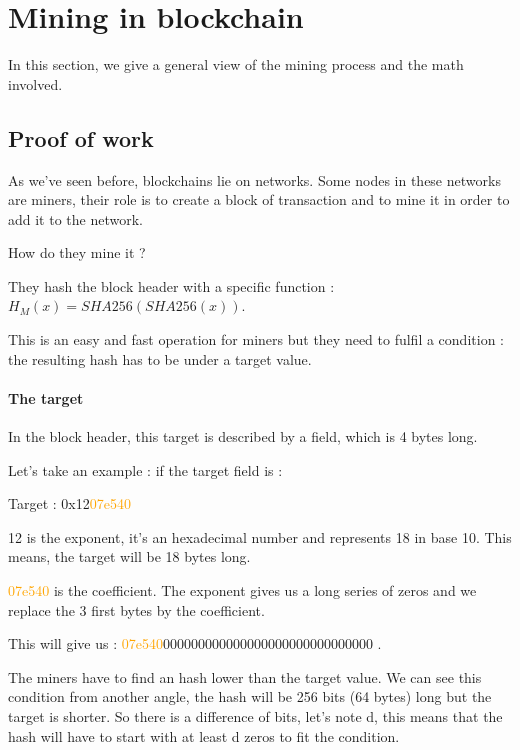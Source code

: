 \section{Mining in blockchain} \label{mining}

In this section, we give a general view of the mining process and the math involved.

  \subsection{Proof of work}

As we've seen before, blockchains lie on networks. Some nodes in these networks are miners, their role is to create a block of transaction and to mine it in order to add it to the network. \newline

How do they mine it ? \newline

They hash the block header with a specific function : $H_M(x) = SHA256(SHA256(x))$.

This is an easy and fast operation for miners but they need to fulfil a condition : the resulting hash has to be under a target value.

  \paragraph{The target} \label{target}

In the block header, this target is described by a field, which is 4 bytes long.

Let's take an example : if the target field is : \newline

Target : 0x12\textcolor{orange}{07e540} \newline

12 is the exponent, it's an hexadecimal number and represents 18 in base 10. This means, the target will be 18 bytes long.

\textcolor{orange}{07e540} is the coefficient. The exponent gives us a long series of zeros and we replace the 3 first bytes by the coefficient. \newline

This will give us : \textcolor{orange}{07e540}000000000000000000000000000000 . \newline

The miners have to find an hash lower than the target value. We can see this condition from another angle, the hash will be 256 bits (64 bytes) long but the target is shorter. So there is a difference of bits, let's note d, this means that the hash will have to start with at least d zeros to fit the condition. \newline

